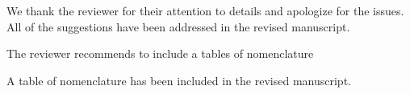 \documentclass[11pt,answers]{exam}
\begin{document}
\begin{questions}
    \begin{solutionorbox} \label{comment:3_5}
        We thank the reviewer for their attention to details and apologize for the issues. All of the suggestions have been addressed in the revised manuscript.
    \end{solutionorbox}


    \question The reviewer recommends to include a tables of nomenclature

    \begin{solutionorbox} \label{comment:3_6}
        A table of nomenclature has been included in the revised manuscript.
    \end{solutionorbox}
\end{questions}


\newpage


\end{document}
